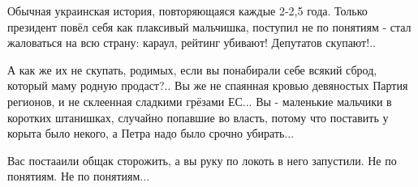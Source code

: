 Обычная украинская история, повторяющаяся каждые 2-2,5 года. Только президент
повёл себя как плаксивый мальчишка, поступил не по понятиям - стал жаловаться
на всю страну: караул, рейтинг убивают! Депутатов скупают!.. 

А как же их не скупать, родимых, если вы понабирали себе всякий сброд, который
маму родную продаст?.. Вы же не спаянная кровью девяностых Партия регионов, и
не склеенная сладкими грёзами ЕС... Вы - маленькие мальчики в коротких
штанишках, случайно попавшие во власть, потому что поставить у корыта было
некого, а Петра надо было срочно убирать... 

Вас постааили общак сторожить, а вы руку по локоть в него запустили. Не по
понятиям. Не по понятиям...

